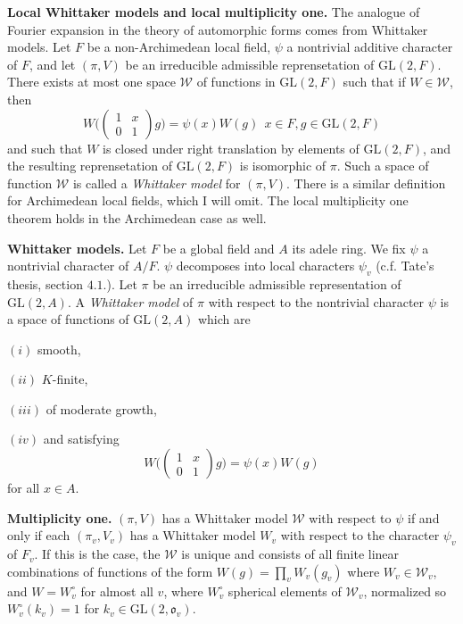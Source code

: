 \documentclass[12pt, letterpaper, twoside]
{article}
\newcommand{\GL}{{\text{GL}}} %
\newcommand{\oI}{\mathfrak{o}} %
\begin{document}
\textbf{Local Whittaker models and local multiplicity one.} The analogue of
Fourier expansion in the theory of automorphic forms comes from Whittaker
models. Let $F$ be a non-Archimedean local field, $\psi$ a nontrivial additive
character of $F$, and let $(\pi, V)$ be an irreducible admissible reprensetation
of $\GL(2, F)$. There exists at most one space $\mathcal{W}$ of functions in
$\GL(2, F)$ such that if $W \in \mathcal{W}$, then
\[W \bigg( \begin{pmatrix} 1 & x \\ 0 & 1 \end{pmatrix} g\bigg) = \psi(x)W(g)\,
\; x \in F, g \in \GL(2, F)\] and such that $W$ is closed under right
translation by elements of $\GL(2, F)$, and the resulting reprensetation of
$\GL(2, F)$ is isomorphic of $\pi$. Such a space of function $\mathcal{W}$ is
called a \textit{Whittaker model} for $(\pi, V)$. There is a similar definition
for Archimedean local fields, which I will omit. The local multiplicity one
theorem holds in the Archimedean case as well.

\textbf{Whittaker models.} Let $F$ be a global field and $A$ its adele ring. We
fix $\psi$ a nontrivial character of $A/F$. $\psi$ decomposes into local
characters $\psi_v$ (c.f. Tate's thesis, section $4.1.$). Let $\pi$ be an
irreducible admissible representation of $\GL(2, A)$. A \textit{Whittaker model}
of $\pi$ with respect to the nontrivial character $\psi$ is a space of functions
of $\GL(2, A)$ which are

$(i)$ smooth,

$(ii)$ $K$-finite,

$(iii)$ of moderate growth,

$(iv)$ and satisfying
\[W \bigg( \begin{pmatrix} 1 & x \\ 0 & 1 \end{pmatrix} g \bigg) = \psi(x)
W(g)\] for all $x \in A$.

\textbf{Multiplicity one.} $(\pi, V)$ has a Whittaker model $\mathcal{W}$ with
respect to $\psi$ if and only if each $(\pi_v, V_v)$ has a Whittaker model $W_v$
with respect to the character $\psi_v$ of $F_v$. If this is the case, the
$\mathcal{W}$ is unique and consists of all finite linear combinations of
functions of the form $W(g) = \prod_v W_v(g_v)$ where $W_v \in \mathcal{W}_v$,
and $W = W_v^\circ$ for almost all $v$, where $W_v^\circ$ spherical elements of
$\mathcal{W}_v$, normalized so $W_v^\circ(k_v) = 1$ for $k_v \in \GL(2, \oI_v)$.
\end{document}
